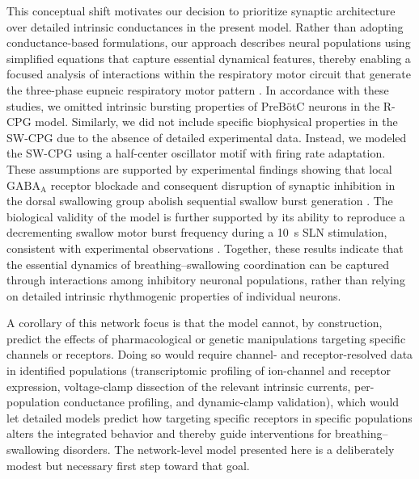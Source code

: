 \documentclass[pdflatex,sn-mathphys-ay]{sn-jnl}%
\theoremstyle{thmstyleone}%
\theoremstyle{thmstyletwo}%
\theoremstyle{thmstylethree}%
\begin{document}
This conceptual shift motivates our decision to prioritize synaptic architecture over detailed intrinsic conductances in the present model. Rather than adopting conductance-based formulations, our approach describes neural populations using simplified equations that capture essential dynamical features, thereby enabling a focused analysis of interactions within the respiratory motor circuit that generate the three-phase eupneic respiratory motor pattern \citep{molkov2017computational, tolmachev2018modeling}. In accordance with these studies, we omitted intrinsic bursting properties of PreBötC neurons in the R-CPG model. Similarly, we did not include specific biophysical properties in the SW-CPG due to the absence of detailed experimental data. Instead, we modeled the SW-CPG using a half-center oscillator motif with firing rate adaptation. These assumptions are supported by experimental findings showing that local $\text{GABA}_{\text{A}}$ receptor blockade and consequent disruption of synaptic inhibition in the dorsal swallowing group abolish sequential swallow burst generation \citep{bautista2014ponto}. The biological validity of the model is further supported by its ability to reproduce a decrementing swallow motor burst frequency during a 10~s SLN stimulation, consistent with experimental observations \citep{fuse2019effects, fuse2025spatio, takemura2022effect, hashimoto2019activity, kinoshita2021influences}. 
Together, these results indicate that the essential dynamics of breathing–swallowing coordination can be captured through interactions among inhibitory neuronal populations, rather than relying on detailed intrinsic rhythmogenic properties of individual neurons.

A corollary of this network focus is that the model cannot, by construction, predict the effects of pharmacological or genetic manipulations targeting specific channels or receptors. Doing so would require channel- and receptor-resolved data in identified populations (transcriptomic profiling of ion-channel and receptor expression, voltage-clamp dissection of the relevant intrinsic currents, per-population conductance profiling, and dynamic-clamp validation), which would let detailed models predict how targeting specific receptors in specific populations alters the integrated behavior and thereby guide interventions for breathing--swallowing disorders. The network-level model presented here is a deliberately modest but necessary first step toward that goal.
\end{document}

